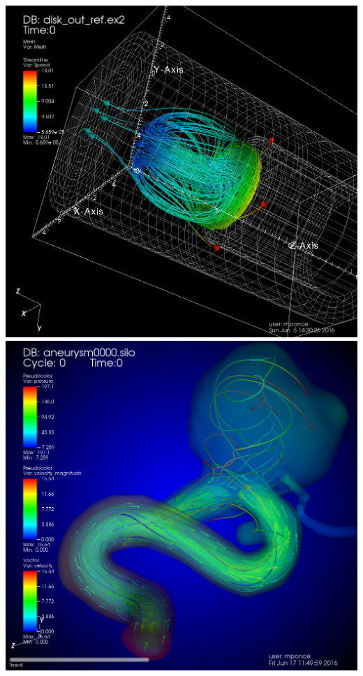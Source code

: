 \begin{frame}
\begin{columns}
\begin{column}{13cm}
        \includegraphics[width=.5\columnwidth]{figs/visit-handson/disk_out_ref-streamlines}
        \includegraphics[width=.5\columnwidth]{figs/visit-pract/VisIt_aneurysm0}
\end{column}
\end{columns}
\end{frame}


